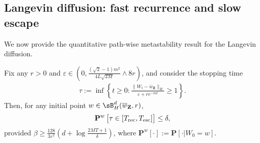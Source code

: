\documentclass[final,12pt]{colt2018}
\numberwithin{equation}{section}
\numberwithin{equation}{section}
\def\PP{\mathbf{P}}
\def\deq{:=}
\def\bd#1{\mathbf{#1}}
\def\bZ{\bd{Z}}
\def\barw{\overline{w}}
\def\eps{\varepsilon}
\begin{document}
   
\subsection{Langevin diffusion: fast recurrence and slow escape}

We now provide the quantitative path-wise metastability result for the Langevin diffusion.

\begin{proposition}\label{prop:FR_SE} Fix any $r > 0$ and $\eps \in (0, \frac{(\sqrt{2}-1)m^2}{4L\sqrt{2M}}\wedge 8r)$, and consider
the stopping time
\begin{align*}
	\tau \deq \inf\left\{ t \ge 0: \frac{\|W_t - \barw_\bZ\|_H}{\eps + r e^{-mt}} \ge 1 \right\}.
\end{align*}
Then, for any initial point $w \in \sB^d_H(\barw_\bZ,r)$,
\begin{align*}
	\PP^{w}\left[ \tau \in [T_{\rm rec},T_{\rm esc}]\right] \le \delta,
\end{align*}
provided $\beta \ge \frac{128}{3\eps^2}\left(d +\log \frac{2MT+1}{\delta}\right)$, where $\PP^w[\cdot] \deq \PP[\cdot|W_0 = w]$.
\end{proposition}
\end{document}
